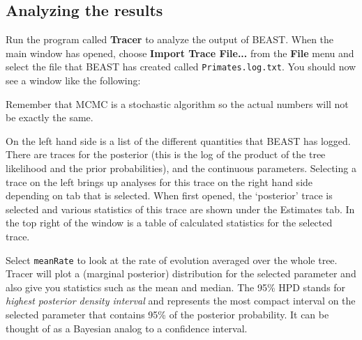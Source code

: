\documentclass[12pt]{article}
\begin{document}
\subsection*{Analyzing the results}

Run the program called {\bf Tracer} to analyze the output of BEAST. When the main
window has opened, choose {\bf Import Trace File...} from the {\bf File} menu and select the file that
BEAST has created called \texttt{Primates.log.txt}.
You should now see a window like the following:

\medskip{}


\medskip{}

Remember that MCMC is a stochastic algorithm so the actual numbers will not be exactly the same.

On the left hand side is a list of the different quantities that BEAST has logged. 
There are traces for the posterior (this
is the log of the product of the tree likelihood and the prior probabilities), and the continuous parameters. Selecting a trace
on the left brings up analyses for this trace on the right hand side depending on tab that is selected. When first opened, the
`posterior' trace is selected and various statistics of this trace are shown under the Estimates tab.
In the top right of the window is a table of calculated statistics for the selected trace. 

Select \texttt{meanRate} to look at
the rate of evolution averaged over the whole tree. Tracer will plot a (marginal posterior) distribution for the selected parameter and also give you
statistics such as the mean and median. The 95\% HPD stands for {\it highest posterior density interval} and represents the most compact interval on the selected parameter that contains 95\% of the posterior probability. It can be thought of as a Bayesian analog to a confidence interval. 
\end{document}
